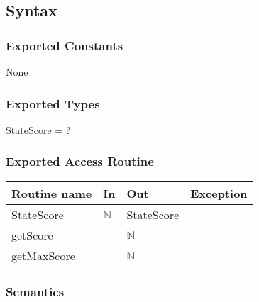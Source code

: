 \documentclass[11pt]{article}
\begin{document}
\subsection*{Syntax}
\label{sec:orged21033}
\subsubsection*{Exported Constants}
\label{sec:orgab20d67}
None

\subsubsection*{Exported Types}
\label{sec:org01aa310}
StateScore = ?

\subsubsection*{Exported Access Routine}
\label{sec:org6fad6c6}
\begin{center}
\begin{tabular}{l|l|l|l}
Routine name & In & Out & Exception\\
\hline
StateScore & \(\mathbb{N}\) & StateScore & \\
getScore &  & \(\mathbb{N}\) & \\
getMaxScore &  & \(\mathbb{N}\) & \\
\end{tabular}
\end{center}

\subsubsection*{Semantics}
\label{sec:orgf597f19}
\end{document}
